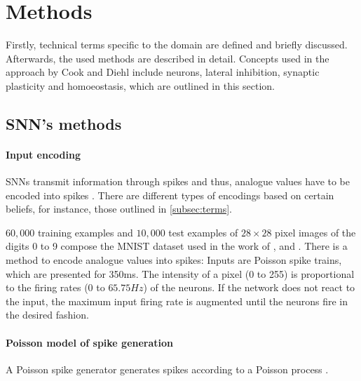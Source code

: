 \section{Methods}
\label{subsec:methods}

Firstly, technical terms specific to the domain are defined and briefly discussed.
Afterwards, the used methods are described in detail.
Concepts used in the approach by Cook and Diehl \cite{SNN} include  neurons, lateral inhibition, synaptic plasticity and homoeostasis, which are outlined in this section.



\subsection{\ac{SNN}'s methods}

\paragraph{\textbf{Input encoding}}
\acp{SNN} transmit information through spikes and thus, analogue values have to be encoded into spikes \cite{DIET_SNN}.
There are different types of encodings based on certain beliefs, 
for instance, those outlined in \autoref{subsec:terms}.

$60,000$ training examples and $10,000$ test examples of $28\times 28$ pixel images of the digits 0 to 9 compose the MNIST dataset used in the work of 
\authorsSNN{}, \authorsANNSNNconversion{} and \authorsRBMSNN{} \cite{SNN,ANN_SNN_conversion,RBM_SNN}.
There is a method to encode analogue values into spikes:
Inputs are Poisson spike trains, which are presented for 350ms.
The intensity of a pixel (0 to 255) is proportional to the firing rates (0 to $65.75 Hz$) of the neurons.
If the network does not react to the input, the maximum input firing rate is augmented until the neurons fire in the desired fashion. 

\vspace{-3mm}
\paragraph{\textbf{Poisson model of spike generation}}
A Poisson spike generator generates spikes according to a Poisson process \cite{poisson_spike_generation}.
 
